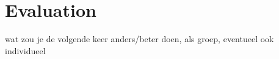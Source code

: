 
\section{Evaluation}
wat zou je de volgende keer anders/beter doen, als groep, eventueel ook individueel
